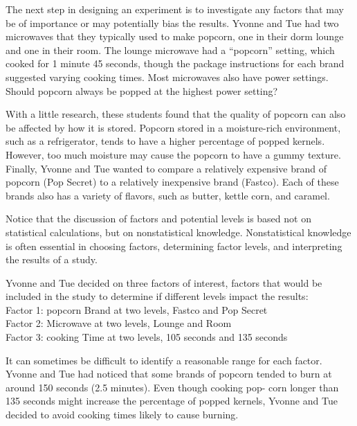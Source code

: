 \documentclass[
]{report}
\theoremstyle{definition}
\theoremstyle{definition}
\theoremstyle{definition}
\theoremstyle{definition}
\theoremstyle{remark}
\begin{document}
The next step in designing an experiment is to investigate any factors that may be of importance or may
potentially bias the results. Yvonne and Tue had two microwaves that they typically used to make popcorn,
one in their dorm lounge and one in their room. The lounge microwave had a ``popcorn'' setting, which cooked
for 1 minute 45 seconds, though the package instructions for each brand suggested varying cooking times.
Most microwaves also have power settings. Should popcorn always be popped at the highest power setting?

With a little research, these students found that the quality of popcorn can also be affected by how it is
stored. Popcorn stored in a moisture-rich environment, such as a refrigerator, tends to have a higher percentage
of popped kernels. However, too much moisture may cause the popcorn to have a gummy texture. Finally,
Yvonne and Tue wanted to compare a relatively expensive brand of popcorn (Pop Secret) to a relatively
inexpensive brand (Fastco). Each of these brands also has a variety of flavors, such as butter, kettle corn, and
caramel.

Notice that the discussion of factors and potential levels is based not on statistical calculations, but on
nonstatistical knowledge. Nonstatistical knowledge is often essential in choosing factors, determining factor
levels, and interpreting the results of a study.

Yvonne and Tue decided on three factors of interest, factors that would be included in the study to
determine if different levels impact the results:\\
Factor 1: popcorn Brand at two levels, Fastco and Pop Secret\\
Factor 2: Microwave at two levels, Lounge and Room\\
Factor 3: cooking Time at two levels, 105 seconds and 135 seconds

It can sometimes be difficult to identify a reasonable range for each factor. Yvonne and Tue had noticed
that some brands of popcorn tended to burn at around 150 seconds (2.5 minutes). Even though cooking pop-
corn longer than 135 seconds might increase the percentage of popped kernels, Yvonne and Tue decided to
avoid cooking times likely to cause burning.
\end{document}
